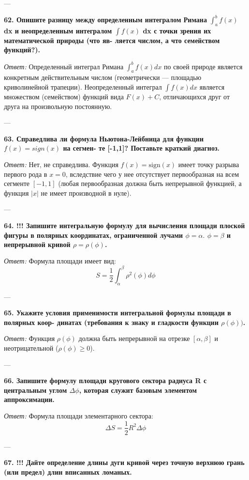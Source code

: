 \documentclass{article}
\begin{document}
---

\textbf{62. Опишите разницу между определенным интегралом Римана $\int_{a}^{b}f(x)$ dx и неопределенным интегралом $\int f(x)$ dx с точки зрения их математической природы (что яв- ляется числом, а что семейством функций?).}

\textit{Ответ:} Определенный интеграл Римана $\int_a^b f(x) dx$ по своей природе является конкретным действительным числом (геометрически — площадью криволинейной трапеции). Неопределенный интеграл $\int f(x) dx$ является множеством (семейством) функций вида $F(x) + C$, отличающихся друг от друга на произвольную постоянную.

---

\textbf{63. Справедлива ли формула Ньютона-Лейбница для функции $f(x)=sign(x)$ на сегмен- те [-1,1]? Поставьте краткий диагноз.}

\textit{Ответ:} Нет, не справедлива. Функция $f(x) = \text{sign}(x)$ имеет точку разрыва первого рода в $x=0$, вследствие чего у нее отсутствует первообразная на всем сегменте $[-1, 1]$ (любая первообразная должна быть непрерывной функцией, а функция $|x|$ не имеет производной в нуле).

---

\textbf{64. !!! Запишите интегральную формулу для вычисления площади плоской фигуры в полярных координатах, ограниченной лучами $\phi=\alpha.$ $\phi=\beta$ и непрерывной кривой $\rho=\rho(\phi)$.}

\textit{Ответ:} Формула площади имеет вид:
$$ S = \frac{1}{2} \int_{\alpha}^{\beta} \rho^2(\phi) d\phi $$

---

\textbf{65. Укажите условия применимости интегральной формулы площади в полярных коор- динатах (требования к знаку и гладкости функции $\rho(\phi))$.}

\textit{Ответ:} Функция $\rho(\phi)$ должна быть непрерывной на отрезке $[\alpha, \beta]$ и неотрицательной ($\rho(\phi) \ge 0$).

---

\textbf{66. Запишите формулу площади кругового сектора радиуса R с центральным углом $\Delta\phi$, которая служит базовым элементом аппроксимации.}

\textit{Ответ:} Формула площади элементарного сектора:
$$ \Delta S = \frac{1}{2} R^2 \Delta\phi $$

---

\textbf{67. !!! Дайте определение длины дуги кривой через точную верхнюю грань (или предел) длин вписанных ломаных.}
\end{document}
